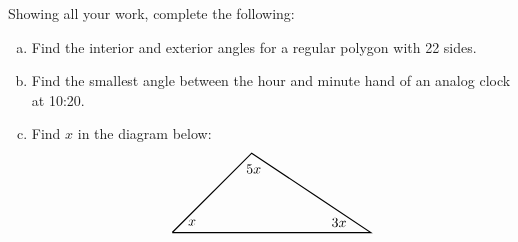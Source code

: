 \documentclass[11pt,letterpaper]{article}
\begin{document}

 Showing all your work, complete the following:
	\begin{enumerate}[(a)]
	\item Find the interior and exterior angles for a regular polygon with 22 sides. 
	\item Find the smallest angle between the hour and minute hand of an analog clock at 10:20. 
	\item Find $x$ in the diagram below:
		\[
		\begin{tikzpicture}
		\draw[line width=0.03cm] (0,0) -- (2,2) -- (5,0) -- (0,0);
		\node at (0.5,0.25) {$x$};
		\node at (2.05,1.6) {$5x$};
		\node at (4.2,0.25) {$3x$};
		\end{tikzpicture}
		\]
	\end{enumerate} \pspace
\end{document}
